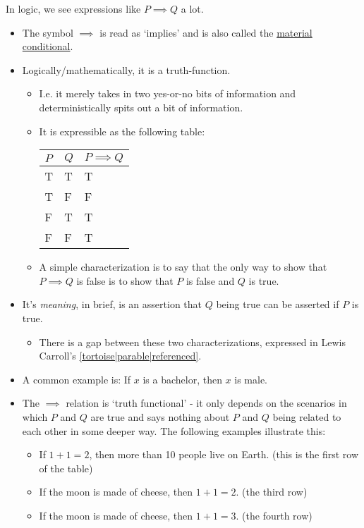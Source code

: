 In logic, we see expressions like $P \implies Q$ a lot.
\begin{itemize}
    \item The symbol $\implies$ is read as `implies' and is also called the \href{https://en.wikipedia.org/wiki/Material_conditional}{material conditional}.
    \item Logically/mathematically, it is a truth-function. \begin{itemize}
    \item I.e. it merely takes in two yes-or-no bits of information and deterministically spits out a bit of information.
    \item It is expressible as the following table: \begin{table}[]
        \begin{tabular}{|l|l|l|}
        \hline
        $P$ & $Q$ & $P \implies Q$ \\ \hline
        T & T & T \\ \hline
        T & F & F \\ \hline
        F & T & T \\ \hline
        F & F & T \\ \hline
        \end{tabular}
        \end{table}
        \item A simple characterization is to say that the only way to show that $P\implies Q$ is false is to show that $P$ is false and $Q$ is true.
    \end{itemize}
    \item It's \emph{meaning}, in brief, is an assertion that $Q$ being true can be asserted if $P$ is true.
        \begin{itemize}
        \item  There is a gap between these two characterizations, expressed in Lewis Carroll's \ref{tortoise|parable|referenced}.
        \end{itemize}
    \item A common example is: If $x$ is a bachelor, then $x$ is male.
    \item The $\implies$ relation is `truth functional' - it only depends on the scenarios in which $P$ and $Q$ are true and says nothing about $P$ and $Q$ being related to each other in some deeper way. The following examples illustrate this:
    \begin{itemize}
        \item If $1+1=2$, then more than 10 people live on Earth. (this is the first row of the table)
        \item If the moon is made of cheese, then $1+1=2$. (the third row)
        \item If the moon is made of cheese, then $1+1=3$. (the fourth row)
    \end{itemize}
\end{itemize}
